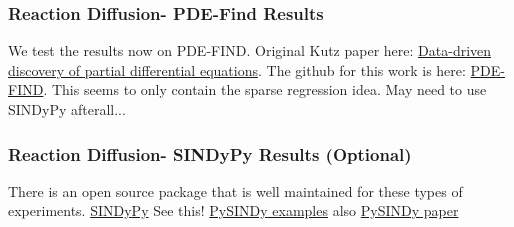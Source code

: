 \documentclass[12pt]{article}
\begin{document}
\subsubsection{Reaction Diffusion- PDE-Find Results}
We test the results now on PDE-FIND. Original Kutz paper here: \href{https://www.science.org/doi/pdf/10.1126/sciadv.1602614}{Data-driven discovery of partial differential equations}.
The github for this work is here: \href{https://github.com/snagcliffs/PDE-FIND}{PDE-FIND}.
This seems to only contain the sparse regression idea. May need to use SINDyPy afterall...

\subsubsection{Reaction Diffusion- SINDyPy Results (Optional)}
There is an open source package that is well maintained for these types of experiments.
\href{https://github.com/dynamicslab/pysindy}{SINDyPy}
See this! \href{https://pysindy.readthedocs.io/en/stable/examples/10_PDEFIND_examples.html#test-pde-functionality-on-2d-reaction-diffusion-system}{PySINDy examples}
also \href{https://arxiv.org/pdf/2111.08481.pdf)}{PySINDy paper}
\end{document}
